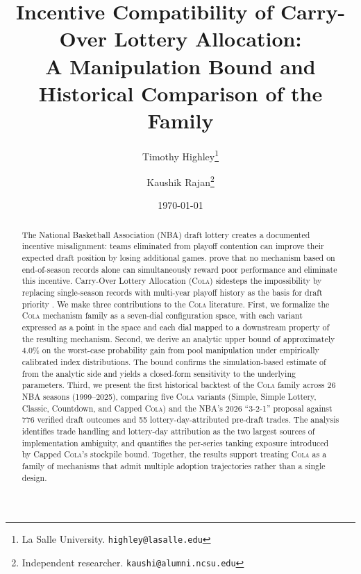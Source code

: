\documentclass[11pt,a4paper]{article}
\title{Incentive Compatibility of Carry-Over Lottery Allocation:\\
A Manipulation Bound and Historical Comparison of the \cola{} Family}
\author{
  Timothy Highley\thanks{La Salle University. \texttt{highley@lasalle.edu}}
  \and
  Kaushik Rajan\thanks{Independent researcher. \texttt{kaushi@alumni.ncsu.edu}}
}
\date{\today}
\newcommand{\cola}{\textup{\textsc{Cola}}}
\begin{document}
\maketitle

\begin{abstract}
The National Basketball Association (NBA) draft lottery creates a documented incentive misalignment: teams eliminated from playoff contention can improve their expected draft position by losing additional games. \citet{munro2020notanking} prove that no mechanism based on end-of-season records alone can simultaneously reward poor performance and eliminate this incentive. Carry-Over Lottery Allocation (\cola{}) sidesteps the impossibility by replacing single-season records with multi-year playoff history as the basis for draft priority \citep{highley2026cola}. We make three contributions to the \cola{} literature. First, we formalize the \cola{} mechanism family as a seven-dial configuration space, with each variant expressed as a point in the space and each dial mapped to a downstream property of the resulting mechanism. Second, we derive an analytic upper bound of approximately $4.0\%$ on the worst-case probability gain from pool manipulation under empirically calibrated index distributions. The bound confirms the simulation-based estimate of \citet{highley2026cola} from the analytic side and yields a closed-form sensitivity to the underlying parameters. Third, we present the first historical backtest of the \cola{} family across 26 NBA seasons (1999--2025), comparing five \cola{} variants (Simple, Simple Lottery, Classic, Countdown, and Capped \cola{}) and the NBA's 2026 ``3-2-1'' proposal against 776 verified draft outcomes and 55 lottery-day-attributed pre-draft trades. The analysis identifies trade handling and lottery-day attribution as the two largest sources of implementation ambiguity, and quantifies the per-series tanking exposure introduced by Capped \cola{}'s stockpile bound. Together, the results support treating \cola{} as a family of mechanisms that admit multiple adoption trajectories rather than a single design.
\end{abstract}











\end{document}
